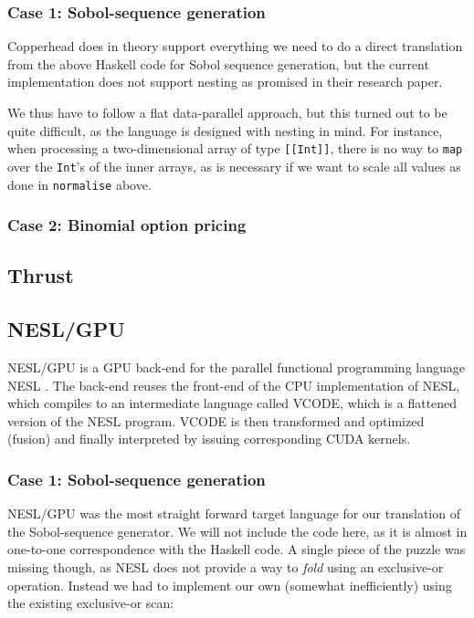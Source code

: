\documentclass[preprint]{sigplanconf}
\begin{document}
\subsubsection{Case 1: Sobol-sequence generation}
Copperhead does in theory support everything we need to do a direct
translation from the above Haskell code for Sobol sequence generation,
but the current implementation does not support nesting as promised in
their research paper.

We thus have to follow a flat data-parallel approach, but this turned
out to be quite difficult, as the language is designed with nesting in
mind. For instance, when processing a two-dimensional array of type
\texttt{[[Int]]}, there is no way to \texttt{map} over the
\texttt{Int}'s of the inner arrays, as is necessary if we want to
scale all values as done in \texttt{normalise} above.

\subsubsection{Case 2: Binomial option pricing}

\subsection{Thrust}
\subsection{NESL/GPU}
NESL/GPU is a GPU back-end for the parallel functional programming
language NESL \cite{}. The back-end reuses the front-end of the CPU
implementation of NESL, which compiles to an intermediate language
called VCODE, which is a flattened version of the NESL program. VCODE
is then transformed and optimized (fusion) and finally interpreted by
issuing corresponding CUDA kernels.

\subsubsection{Case 1: Sobol-sequence generation}
NESL/GPU was the most straight forward target language for our
translation of the Sobol-sequence generator. We will not include the
code here, as it is almost in one-to-one correspondence with the
Haskell code.  A single piece of the puzzle was missing though, as
NESL does not provide a way to \emph{fold} using an exclusive-or
operation. Instead we had to implement our own (somewhat
inefficiently) using the existing exclusive-or scan:
\end{document}
